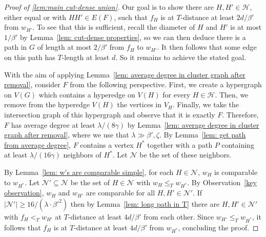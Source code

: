 \documentclass[10pt]{article}
\theoremstyle{definition}
\let\leq\leqslant
\let\geq\geqslant
\begin{document}
\begin{proof}[Proof of \cref{lem:main cut-dense union}]
    Our goal is to show there are $H,H'\in\mathcal H$, either equal or with $HH'\in E(F)$, such that $f_H$ is at $T$-distance at least $2d/\beta' $ from $w_{H'}$. To see that this is sufficient, recall the diameter of $H$ and $H'$ is at most $1/\beta' $ by Lemma~\ref{lem: cut-dense properties}, so we can then deduce there is a path in $G$ of length at most $2/\beta' $ from $f_H$ to $w_{H'}$. It then follows that some edge on this path has $T$-length at least $d$. So it remains to achieve the stated goal.
    
    With the aim of applying Lemma~\ref{lem: average degree in cluster graph after removal}, consider $F$ from the following perspective. First, we create a hypergraph on $V(G)$ which contains a hyperedge on $V(H)$ for every $H\in\mathcal H$. Then, we remove from the hyperedge $V(H)$ the vertices in $V_H$. Finally, we take the intersection graph of this hypergraph and observe that it is exactly $F$. Therefore, $F$ has average degree at least $\lambda/(8\gamma)$ by Lemma~\ref{lem: average degree in cluster graph after removal}, where we use that $\lambda\gg\beta',\zeta$. By Lemma~\ref{lem: get path from average degree}, $F$ contains a vertex $H^*$ together with a path $P$ containing at least $\lambda /(16\gamma)$ neighbors of $H^*$. Let $\mathcal N$ be the set of these neighbors. 
    
    By Lemma~\ref{lem: w's are comparable simple}, for each $H\in\mathcal N$, $w_H$ is comparable to $w_{H^*}$. Let $\mathcal N'\subseteq \mathcal N$ be the set of $H\in\mathcal N$ with $w_H\leq_T w_{H^*}$. By Observation~\ref{key observation}, $w_H$ and $w_{H'}$ are comparable for all $H,H'\in\mathcal N'$.
    If $|\mathcal N'|\geq 16/(\lambda \cdot \beta'^2 )$ then by Lemma~\ref{lem: long path in T} there are $H,H'\in\mathcal N'$ with $f_H<_T w_{H'}$ at $T$-distance at least $4d/\beta' $ from each other. Since $w_{H'}\leq_T w_{H^*}$, it follows that $f_H$ is at $T$-distance at least $4d/\beta' $ from $w_{H^*}$, concluding the proof.
    

\end{proof}
\end{document}
